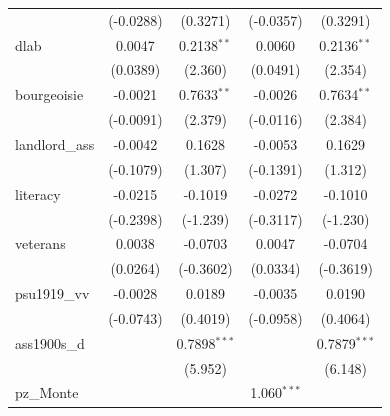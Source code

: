 \begin{table}[htbp]
\begin{tabular}{lcccc}
                                       & (-0.0288)             & (0.3271)                    & (-0.0357)            & (0.3291)\\   
      dlab                             & 0.0047                & 0.2138$^{**}$               & 0.0060               & 0.2136$^{**}$\\   
                                       & (0.0389)              & (2.360)                     & (0.0491)             & (2.354)\\   
      bourgeoisie                      & -0.0021               & 0.7633$^{**}$               & -0.0026              & 0.7634$^{**}$\\   
                                       & (-0.0091)             & (2.379)                     & (-0.0116)            & (2.384)\\   
      landlord\_ass                    & -0.0042               & 0.1628                      & -0.0053              & 0.1629\\   
                                       & (-0.1079)             & (1.307)                     & (-0.1391)            & (1.312)\\   
      literacy                         & -0.0215               & -0.1019                     & -0.0272              & -0.1010\\   
                                       & (-0.2398)             & (-1.239)                    & (-0.3117)            & (-1.230)\\   
      veterans                         & 0.0038                & -0.0703                     & 0.0047               & -0.0704\\   
                                       & (0.0264)              & (-0.3602)                   & (0.0334)             & (-0.3619)\\   
      psu1919\_vv                      & -0.0028               & 0.0189                      & -0.0035              & 0.0190\\   
                                       & (-0.0743)             & (0.4019)                    & (-0.0958)            & (0.4064)\\   
      ass1900s\_d                      &                       & 0.7898$^{***}$              &                      & 0.7879$^{***}$\\   
                                       &                       & (5.952)                     &                      & (6.148)\\   
      pz\_Monte                        &                       &                             & 1.060$^{***}$        &   \\   

\end{tabular}
\end{table}
